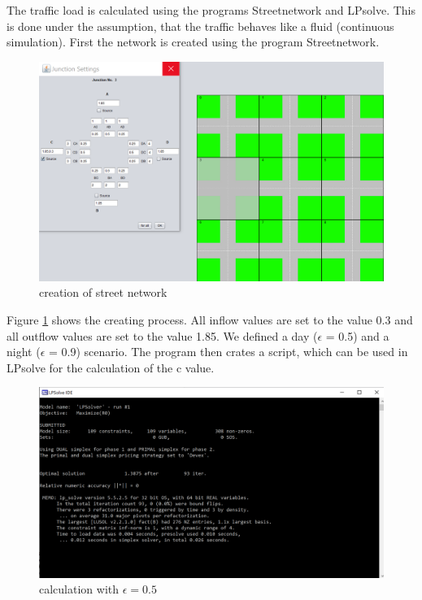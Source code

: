 \documentclass[./\jobname.tex]{subfiles}
\begin{document}
The traffic load is calculated using the programs Streetnetwork and LPsolve. This is done under the assumption, that the traffic behaves like a fluid (continuous simulation). First the network is created using the program Streetnetwork.

\begin{figure}[H]
	\centering
	\includegraphics[width=0.9\linewidth]{../img/png/StreetNetworker.png}
	\caption{creation of street network}
	\label{fig:stret_net}
\end{figure}

Figure \ref{fig:stret_net} shows the creating process. All inflow values are set to the value 0.3 and all outflow values are set to the value 1.85. We defined a day ($\epsilon$ = 0.5) and a night ($\epsilon$ = 0.9) scenario. The program then crates a script, which can be used in LPsolve for the calculation of the c value.

\begin{figure}[H]
	\centering
	\includegraphics[width=0.8\linewidth]{../img/png/epsilon05.png}
	\caption{calculation with $\epsilon = 0.5$}
	\label{fig:epsilon05png}
\end{figure}
\end{document}
